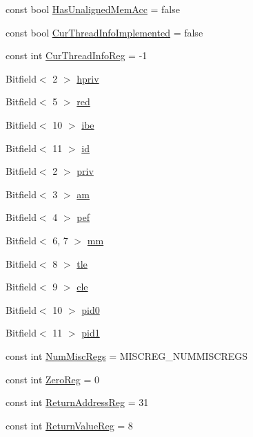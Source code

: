 \begin{DoxyCompactItemize}
const bool \hyperlink{namespaceSparcISA_a1c3adbc67ce574fe545e332d3bc677be}{HasUnalignedMemAcc} = false
\item 
const bool \hyperlink{namespaceSparcISA_a9faf3aac879cfa867d4ae15d4119c45e}{CurThreadInfoImplemented} = false
\item 
const int \hyperlink{namespaceSparcISA_a7e5bf2f33f34327efc1eeccbb0c1141f}{CurThreadInfoReg} = -\/1
\item 
Bitfield$<$ 2 $>$ \hyperlink{namespaceSparcISA_a0ee6b47193187a7e02e4231aaa050d97}{hpriv}
\item 
Bitfield$<$ 5 $>$ \hyperlink{namespaceSparcISA_a3daf539b069b3e0d79ce6137bac5a47f}{red}
\item 
Bitfield$<$ 10 $>$ \hyperlink{namespaceSparcISA_abdfad74473ff8fc48d79349b5243e166}{ibe}
\item 
Bitfield$<$ 11 $>$ \hyperlink{namespaceSparcISA_a2b4cf644f5af9ebaec502fb09986f302}{id}
\item 
Bitfield$<$ 2 $>$ \hyperlink{namespaceSparcISA_a9d8b751eeaa798163459309b2f3d0b80}{priv}
\item 
Bitfield$<$ 3 $>$ \hyperlink{namespaceSparcISA_a221d874609a3a07e22447f60e33cffdb}{am}
\item 
Bitfield$<$ 4 $>$ \hyperlink{namespaceSparcISA_a203c6c0050f595284b99708df75ea6e4}{pef}
\item 
Bitfield$<$ 6, 7 $>$ \hyperlink{namespaceSparcISA_a972c8e9e2b84cfa215016e3a75909c66}{mm}
\item 
Bitfield$<$ 8 $>$ \hyperlink{namespaceSparcISA_a25942cc15f91eb94cbc97367b68f0366}{tle}
\item 
Bitfield$<$ 9 $>$ \hyperlink{namespaceSparcISA_a4aab5f0f9a9d6bace69a277372b64776}{cle}
\item 
Bitfield$<$ 10 $>$ \hyperlink{namespaceSparcISA_a3ce7de5d72770e56d45a875d8dbd0bed}{pid0}
\item 
Bitfield$<$ 11 $>$ \hyperlink{namespaceSparcISA_a806649f8125578a308f65fe50d13ffdc}{pid1}
\item 
const int \hyperlink{namespaceSparcISA_a568d4aa96dd7cd963f3b1b1b0446c9c6}{NumMiscRegs} = MISCREG\_\-NUMMISCREGS
\item 
const int \hyperlink{namespaceSparcISA_a33dbba4a12f6733a5ecc2d2b3542b7ee}{ZeroReg} = 0
\item 
const int \hyperlink{namespaceSparcISA_a99ba4a35fbf9debeb1f7ddb1db7b9967}{ReturnAddressReg} = 31
\item 
const int \hyperlink{namespaceSparcISA_a472eedbcba9726645062b921f8d07e98}{ReturnValueReg} = 8

\end{DoxyCompactItemize}
